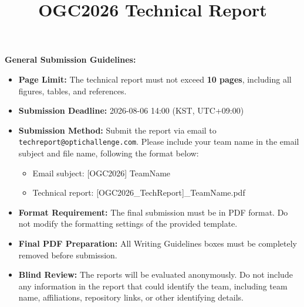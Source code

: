\documentclass[runningheads]{llncs}
\begin{document}
\title{OGC2026 Technical Report}
\maketitle

\begin{guidance}
\textbf{General Submission Guidelines:}
\begin{itemize}
    \item \textbf{Page Limit:} The technical report must not exceed \textbf{10 pages}, including all figures, tables, and references.
    \item \textbf{Submission Deadline:} 2026-08-06 14:00 (KST, UTC+09:00) 
    \item \textbf{Submission Method:} Submit the report via email to \texttt{techreport@optichallenge.com}. Please include your team name in the email subject and file name, following the format below:
\begin{itemize}
\item Email subject: [OGC2026] TeamName
\item Technical report: [OGC2026\_TechReport]\_TeamName.pdf
\end{itemize}
    \item \textbf{Format Requirement:} The final submission must be in PDF format. Do not modify the formatting settings of the provided template.
    \item \textbf{Final PDF Preparation:} All Writing Guidelines boxes must be completely removed before submission.
    \item \textbf{Blind Review:} The reports will be evaluated anonymously. Do not include any information in the report that could identify the team, including team name, affiliations,  repository links, or other identifying details. 
\end{itemize}
\end{guidance}



\end{document}
